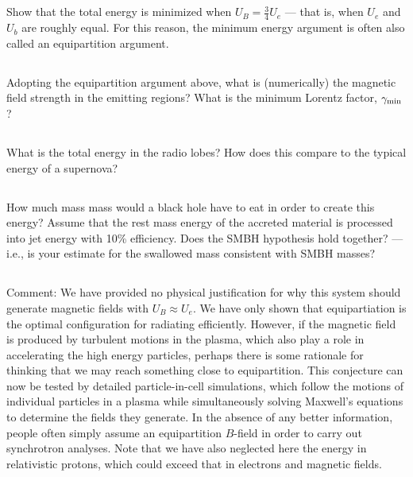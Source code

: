 \documentclass[11pt]{article}
\begin{document}
\subsection{}

Show that the total energy is minimized when $U_B=\frac34 U_e$ --- that is, when $U_e$ and
$U_b$ are roughly equal. For this reason, the minimum energy argument is often
also called an equipartition argument.

\subsection{}
Adopting the equipartition argument above, what is (numerically) the magnetic
field strength in the emitting regions? What is the minimum Lorentz factor,
$\gamma_{\rm min}$?

\subsection{}
What is the total energy in the radio lobes? How does this compare to the typical energy of a supernova?

\subsection{}
How much mass mass would a black hole have to eat in order to create this
energy? Assume that the rest mass energy of the accreted material is
processed into jet energy with 10\% efficiency. Does the SMBH hypothesis hold
together? --- i.e., is your estimate for the swallowed mass consistent with SMBH
masses?

\subsection*{}

Comment: We have provided no physical justification for why this system should
generate magnetic fields with $U_B\approx U_e$. We have only shown that equipartiation
is the optimal configuration for radiating efficiently. However, if the
magnetic field is produced by turbulent motions in the plasma, which also play
a role in accelerating the high energy particles, perhaps there is some
rationale for thinking that we may reach something close to equipartition. This
conjecture can now be tested by detailed particle-in-cell simulations, which
follow the motions of individual particles in a plasma while simultaneously
solving Maxwell's equations to determine the fields they generate. In the
absence of any better information, people often simply assume an equipartition
$B$-field in order to carry out synchrotron analyses. Note that we have also
neglected here the energy in relativistic protons, which could exceed that in
electrons and magnetic fields.
\end{document}
